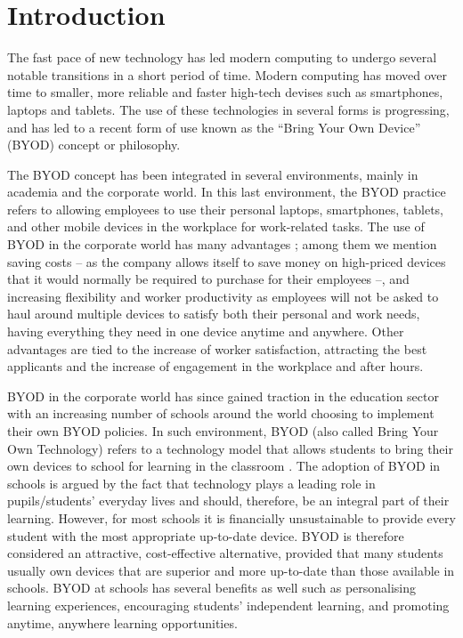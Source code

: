 \documentclass[a4paper,10pt,twocolumn,preprint,3p]{elsarticle}
\begin{document}
\section{Introduction}
\label{sec:intro}
The fast pace of new technology has led modern computing to undergo
several notable transitions in a short period of time. Modern computing has moved
over time to smaller, more reliable and faster high-tech devises such
as smartphones, laptops and tablets. The use of these technologies in
several forms is progressing, and has led to a recent form of use known as
the ``Bring Your Own Device'' (BYOD) concept or philosophy. 

The BYOD concept has been integrated in several environments, mainly in
academia and the corporate world. In this last environment, the BYOD
practice refers to allowing employees to use their
personal laptops, smartphones, tablets, and other mobile devices in
the workplace for work-related tasks. The use of BYOD in the corporate world has many
advantages \cite{singh2012byod}; among them we mention saving costs --
as the company allows itself to save money on high-priced devices that
it would normally be required to purchase for their employees --, and
increasing flexibility and worker productivity as employees will not
be asked to haul around multiple devices to satisfy both their personal and
work needs, having everything they need in one device anytime and
anywhere.  
Other advantages are tied to the increase of worker satisfaction,  attracting the best applicants and the increase of engagement in the workplace and after hours.

BYOD in the corporate world has since gained traction in the education
sector with an increasing number of schools around the world choosing
to implement their own BYOD policies. In such environment, BYOD (also
called Bring Your Own Technology) refers to a technology model that
allows students to bring their own devices to school for learning in
the classroom \cite{sangani2013byod}. The adoption of BYOD in schools
is argued by the fact that technology plays a leading role in
pupils/students' everyday lives and should, therefore, be an integral
part of their learning. However, for most schools it is financially
unsustainable to provide every student with the most appropriate
up-to-date device. BYOD is therefore considered an attractive,
cost-effective alternative, provided that many students usually own
devices that are superior and more up-to-date than those available in
schools. BYOD at schools has several benefits as well such as
personalising learning experiences, encouraging students' independent
learning, and promoting anytime, anywhere learning opportunities. 
\end{document}
